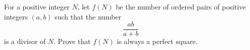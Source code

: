 For a positive integer $N$,  let $f(N)$ be the number of ordered pairs of positive integers $(a,b)$ such that the number$$\frac{ab}{a+b}$$is a divisor of $N$. Prove that $f(N)$ is always a perfect square.